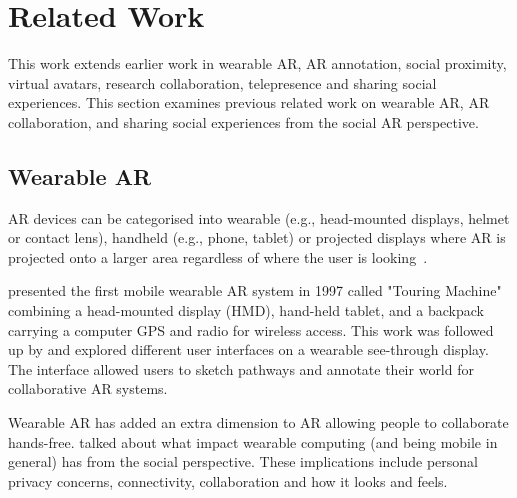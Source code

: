 \chapter{Related Work}
\label{ch:background}



This work extends earlier work in wearable AR, AR annotation, social proximity, virtual avatars, research collaboration, telepresence and sharing social experiences. This section examines previous related work on wearable AR, AR collaboration, and sharing social experiences from the social AR perspective. 

\section{Wearable AR} 

AR devices can be categorised into wearable (e.g., head-mounted displays, helmet or contact lens), handheld (e.g., phone, tablet) or projected displays where AR is projected onto a larger area regardless of where the user is looking~\cite{Peddie2017}. 

\textcite{Feiner1997a} presented the first mobile wearable AR system in 1997 called "Touring Machine" combining a head-mounted display (HMD), hand-held tablet, and a backpack carrying a computer GPS and radio for wireless access. This work was followed up by \textcite{Hollerer1999a} and explored different user interfaces on a wearable see-through display. The interface allowed users to sketch pathways and annotate their world for collaborative AR systems. 

Wearable AR has added an extra dimension to AR allowing people to collaborate hands-free. \textcite{Feiner1999} talked about what impact wearable computing (and being mobile in general) has from the social perspective. These implications include personal privacy concerns, connectivity, collaboration and how it looks and feels. 

